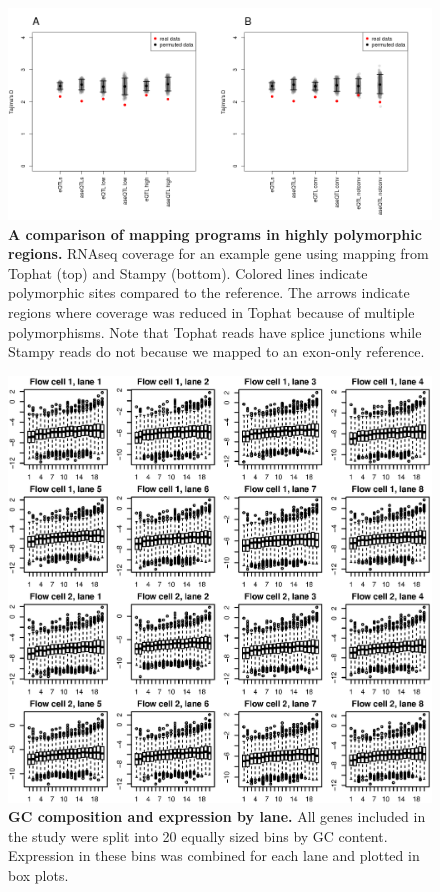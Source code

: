 \begin{figure}[ht]
      \centering
       \includegraphics[width=\linewidth]{Ch3FigS6}
    \caption{\textbf{A comparison of mapping programs in highly polymorphic regions.} RNAseq coverage for an example gene using mapping from Tophat (top) and Stampy (bottom). Colored lines indicate polymorphic sites compared to the reference. The arrows indicate regions where coverage was reduced in Tophat because of multiple polymorphisms. Note that Tophat reads have splice junctions while Stampy reads do not because we mapped to an exon-only reference.}
    \label{fig:3figS6}
\end{figure}

\begin{figure}[ht]
      \centering
       \includegraphics[width=\linewidth]{Ch3FigS7}
    \caption{\textbf{GC composition and expression by lane.} All genes included in the study were split into 20 equally sized bins by GC content. Expression in these bins was combined for each lane and plotted in box plots.}
    \label{fig:3figS7}
\end{figure}


